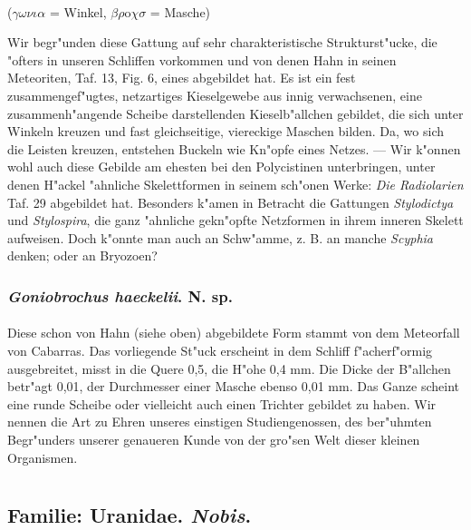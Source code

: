 \documentclass[a4paper, 11pt, oneside]{article}
\begin{document}
\paragraph{}
($\gamma\omega\nu\iota\alpha$ = Winkel, $\beta\rho$o$\chi\sigma$ = Masche)%

Wir begr"unden diese Gattung auf sehr charakteristische Strukturst"ucke, die "ofters in unseren Schliffen vorkommen und von denen Hahn in seinen Meteoriten, Taf. 13, Fig. 6, eines abgebildet hat. Es ist ein fest zusammengef"ugtes, netzartiges Kieselgewebe aus innig verwachsenen, eine zusammenh"angende Scheibe darstellenden Kieselb"allchen gebildet, die sich unter Winkeln kreuzen und fast gleichseitige, viereckige Maschen bilden. Da, wo sich die Leisten kreuzen, entstehen Buckeln wie Kn"opfe eines Netzes. --- Wir k"onnen wohl auch diese Gebilde am ehesten bei den Polycistinen unterbringen, unter denen H"ackel "ahnliche Skelettformen in seinem sch"onen Werke: \emph{Die Radiolarien} Taf. 29 abgebildet hat. Besonders k"amen in Betracht die Gattungen \emph{Stylodictya} und \emph{Stylospira}, die ganz "ahnliche gekn"opfte Netzformen in ihrem inneren Skelett aufweisen. Doch k"onnte man auch an Schw"amme, z. B. an manche \emph{Scyphia} denken; oder an Bryozoen?
\subsubsection{\emph{Goniobrochus haeckelii}. N. sp.}
\paragraph{}
Diese schon von Hahn (siehe oben) abgebildete Form stammt von dem Meteorfall von Cabarras. Das vorliegende St"uck erscheint in dem Schliff f"acherf"ormig ausgebreitet, misst in die Quere 0,5, die H"ohe 0,4 mm. Die Dicke der B"allchen betr"agt 0,01, der Durchmesser einer Masche ebenso 0,01 mm. Das Ganze scheint eine runde Scheibe oder vielleicht auch einen Trichter gebildet zu haben. Wir nennen die Art zu Ehren unseres einstigen Studiengenossen, des ber"uhmten Begr"unders unserer genaueren Kunde von der gro"sen Welt dieser kleinen Organismen.
\clearpage
\section{}
\subsection*{Familie: Uranidae. \emph{Nobis}.}
\end{document}
